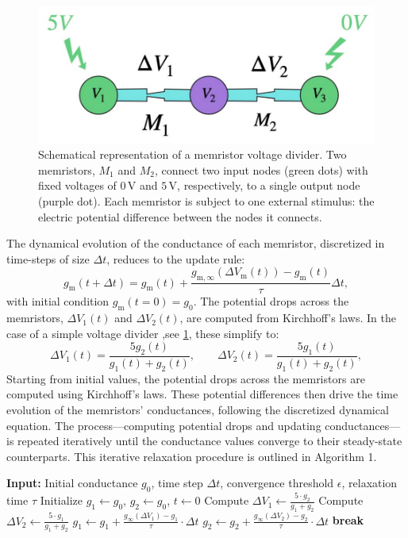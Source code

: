\documentclass[reprint,superscriptaddress,prb,showkeys]{revtex4-2}
\newcommand{\m}{\text{m}} %
\begin{document}
\begin{figure}[H]
    \centering
    \includegraphics[width=0.5\columnwidth]{plots/appendixA/app_vd.pdf}
    \caption{Schematical representation of a memristor voltage divider. Two memristors, \( M_1 \) and \( M_2 \), connect two input nodes (green dots) with fixed voltages of \( 0\,\mathrm{V} \) and \( 5\,\mathrm{V} \), respectively, to a single output node (purple dot). Each memristor is subject to one external stimulus: the electric potential difference between the nodes it connects.
    }
    \label{fig:app_vd}
\end{figure} 
The dynamical evolution of the conductance of each memristor, discretized in time-steps of size $\Delta t$, reduces to the update rule:
\begin{equation}
g_{\m}(t + \Delta t) = g_{\m}(t) +
\frac{g_{\m,\infty}(\Delta V_{\m}(t)) - g_{\m}(t)}{\tau} \Delta t,
\label{eq:conduct}
\end{equation}
with initial condition $g_{\m}(t = 0) = g_0$. The potential drops across the memristors, $\Delta V_1(t)$ and $\Delta V_2(t)$, are computed from Kirchhoff's laws. In the case of a simple voltage divider ,see \cref{fig:app_vd}, these simplify to:
\begin{equation}
\Delta V_1(t) = \frac{5 g_2(t)}{g_1(t)+g_2(t)}, \qquad
\Delta V_2(t) = \frac{5 g_1(t)}{g_1(t)+g_2(t)},
\label{eq:potentials}
\end{equation}
Starting from initial values, the potential drops across the memristors are computed using Kirchhoff’s laws. These potential differences then drive the time evolution of the memristors’ conductances, following the discretized dynamical equation. The process—computing potential drops and updating conductances—is repeated iteratively until the conductance values converge to their steady-state counterparts. This iterative relaxation procedure is outlined in Algorithm 1.

\begin{algorithm}
    \caption{}
    \label{alg:relaxation}
    \begin{algorithmic}[1]
    \State \textbf{Input:} Initial conductance $g_0$, time step $\Delta t$, convergence threshold $\epsilon$, relaxation time $\tau$
    \State Initialize $g_1 \gets g_0$, $g_2 \gets g_0$, $t \gets 0$
        \State Compute $\Delta V_1 \gets \frac{5 \cdot g_2}{g_1 + g_2}$
        \State Compute $\Delta V_2 \gets \frac{5 \cdot g_1}{g_1 + g_2}$
        \State $g_1 \gets g_1 + \frac{g_{\infty}(\Delta V_1) - g_1}{\tau} \cdot \Delta t$
        \State $g_2 \gets g_2 + \frac{g_{\infty}(\Delta V_2) - g_2}{\tau} \cdot \Delta t$
            \State \textbf{break}
        \EndIf
    \EndWhile
    \end{algorithmic}
\end{algorithm}
\end{document}
